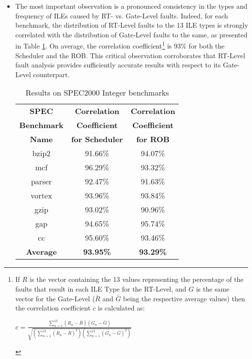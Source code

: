 \documentclass[12pt]{yalephd}
\begin{document}
\begin{itemize}
\item The most important observation is a pronounced consistency in the types and frequency of ILEs caused by RT- vs. Gate-Level faults. Indeed, for each benchmark, the distribution of RT-Level faults to the 13 ILE types is strongly correlated with the distribution of Gate-Level faults to the same, as presented in Table \ref{sC2SPEC_stats_VTS}. On average, the correlation coefficient\footnote{If $R$ is the vector containing the 13 values representing the percentage of the faults that result in each ILE Type for the RT-Level, and $G$ is the same vector for the Gate-Level ($\bar{R}$ and $\bar{G}$ being the respective average values) then the correlation coefficient $c$ is calculated as:

    \begin{center}
    $c = \displaystyle\frac{\sum_{n=1}^{13}{(R_n-\bar{R})(G_n-\bar{G})}}
    {\sqrt{(\sum_{n=1}^{13}{(R_n-\bar{R})^2})(\sum_{n=1}^{13}{(G_n-\bar{G})^2})}}$
    \end{center}} is 93\% for both the Scheduler and the ROB. This critical observation corroborates that RT-Level fault analysis provides sufficiently accurate results with respect to its Gate-Level counterpart.

\begin{table}[!ht]
\begin{center}
\begin{threeparttable}[b]
\caption{Results on SPEC2000 Integer benchmarks}\label{sC2SPEC_stats_VTS}
\begin{tabular}{||c|c|c||}
\hline
\hline
{\bf SPEC}      & {\bf Correlation}   & {\bf Correlation} \\
{\bf Benchmark} & {\bf Coefficient}   & {\bf Coefficient} \\
{\bf Name}      & {\bf for Scheduler\tnote{1}} & {\bf for ROB\tnote{1}}     \\
\hline
bzip2  & 91.66\% & 94.07\% \\
\hline
mcf    & 96.29\% & 93.32\% \\
\hline
parser & 92.47\% & 91.63\% \\
\hline
vortex & 93.96\% & 93.84\% \\
\hline
gzip   & 93.02\% & 90.96\% \\
\hline
gap    & 94.65\% & 95.74\% \\
\hline
cc     & 95.60\% & 93.46\% \\
\hline
\hline
{\bf Average} & {\bf 93.95\%} & {\bf 93.29\%} \\
\hline
\hline
\end{tabular}
\end{threeparttable}
\end{center}
\end{table}


\end{itemize}
\end{document}
